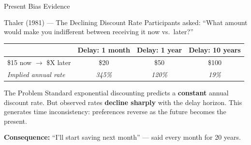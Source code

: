 \documentclass[aspectratio=169]{beamer}
\begin{document}
\begin{frame}{Present Bias Evidence}
\begin{block}{Thaler (1981) --- The Declining Discount Rate}
Participants asked: ``What amount would make you indifferent between receiving it now vs.\ later?''
\end{block}
\begin{center}
\begin{tabular}{lccc}
\toprule
 & \textbf{Delay: 1 month} & \textbf{Delay: 1 year} & \textbf{Delay: 10 years}\\
\midrule
\$15 now $\to$ \$X later & \$20 & \$50 & \$100\\
\textit{Implied annual rate} & \textit{345\%} & \textit{120\%} & \textit{19\%}\\
\bottomrule
\end{tabular}
\end{center}
\begin{alertblock}{The Problem}
Standard exponential discounting predicts a \textbf{constant} annual discount rate. But observed rates \textbf{decline sharply} with the delay horizon. This generates \alert{time inconsistency}: preferences reverse as the future becomes the present.
\end{alertblock}
\pause
\textcolor{bepurple}{\textbf{Consequence:}} ``I'll start saving next month'' --- said every month for 20 years.
\end{frame}
\end{document}
